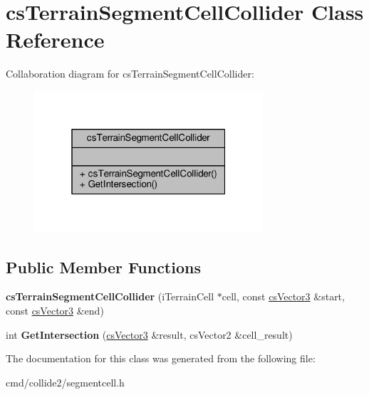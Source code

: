 \hypertarget{classcsTerrainSegmentCellCollider}{}\section{cs\+Terrain\+Segment\+Cell\+Collider Class Reference}
\label{classcsTerrainSegmentCellCollider}


Collaboration diagram for cs\+Terrain\+Segment\+Cell\+Collider\+:
\nopagebreak
\begin{figure}[H]
\begin{center}
\leavevmode
\includegraphics[width=241pt]{d6/d9d/classcsTerrainSegmentCellCollider__coll__graph}
\end{center}
\end{figure}
\subsection*{Public Member Functions}
\begin{DoxyCompactItemize}
\item 
{\bfseries cs\+Terrain\+Segment\+Cell\+Collider} (i\+Terrain\+Cell $\ast$cell, const \hyperlink{classcsVector3}{cs\+Vector3} \&start, const \hyperlink{classcsVector3}{cs\+Vector3} \&end)\hypertarget{classcsTerrainSegmentCellCollider_adba7de0091df9213aff7da1a78fb060d}{}\label{classcsTerrainSegmentCellCollider_adba7de0091df9213aff7da1a78fb060d}

\item 
int {\bfseries Get\+Intersection} (\hyperlink{classcsVector3}{cs\+Vector3} \&result, cs\+Vector2 \&cell\+\_\+result)\hypertarget{classcsTerrainSegmentCellCollider_a012fcbc0d639bb602457161081ec6262}{}\label{classcsTerrainSegmentCellCollider_a012fcbc0d639bb602457161081ec6262}

\end{DoxyCompactItemize}


The documentation for this class was generated from the following file\+:\begin{DoxyCompactItemize}
\item 
cmd/collide2/segmentcell.\+h\end{DoxyCompactItemize}
